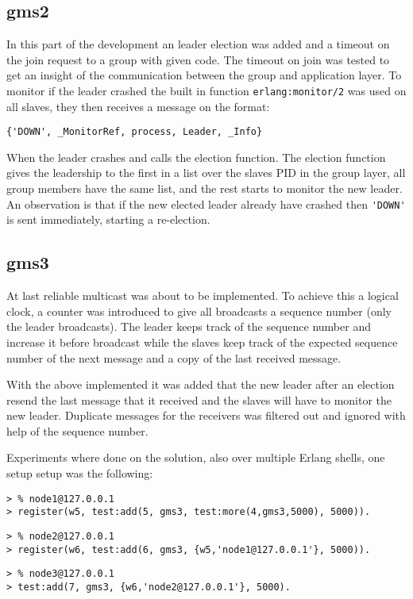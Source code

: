 \documentclass[a4paper, 11pt]{article}
\begin{document}
\subsection{gms2}

In this part of the development an leader election was added and a timeout on the join request to a group with given code. The timeout on join was tested to get an insight of the communication between the group and application layer. To monitor if the leader crashed the built in function \verb!erlang:monitor/2! was used on all slaves, they then receives a message on the format:

\begin{verbatim}
{'DOWN', _MonitorRef, process, Leader, _Info}
\end{verbatim}

When the leader crashes and calls the election function. The election function gives the leadership to the first in a list over the slaves PID in the group layer, all group members have the same list, and the rest starts to monitor the new leader. An observation is that if the new elected leader already have crashed then \verb!'DOWN'! is sent immediately, starting a re-election.

\subsection{gms3}

At last reliable multicast was about to be implemented. To achieve this a logical clock, a counter was introduced to give all broadcasts a sequence number (only the leader broadcasts). The leader keeps track of the sequence number and increase it before broadcast while the slaves keep track of the expected sequence number of the next message and a copy of the last received message.

With the above implemented it was added that the new leader after an election resend the last message that it received and the slaves will have to monitor the new leader. Duplicate messages
for the receivers was filtered out and ignored with help of the sequence number.

Experiments where done on the solution, also over multiple Erlang shells, one setup setup was the following:

\begin{verbatim}
> % node1@127.0.0.1
> register(w5, test:add(5, gms3, test:more(4,gms3,5000), 5000)).
\end{verbatim}
\begin{verbatim}
> % node2@127.0.0.1
> register(w6, test:add(6, gms3, {w5,'node1@127.0.0.1'}, 5000)).
\end{verbatim}
\begin{verbatim}
> % node3@127.0.0.1
> test:add(7, gms3, {w6,'node2@127.0.0.1'}, 5000).
\end{verbatim}
\end{document}
